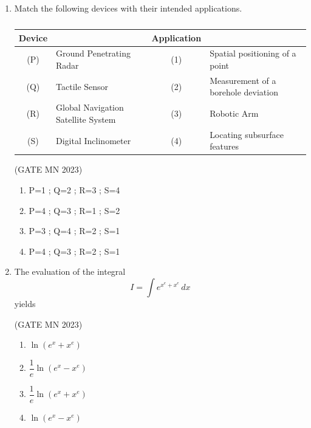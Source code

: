 \documentclass[journal]{IEEEtran}
\begin{document}
\begin{enumerate}
\hfill(GATE MN 2023)
\begin{enumerate}
    \item Shotcrete of thickness 9--12 cm, bolt length of 2.7--2.8 m
    \item Shotcrete of thickness 9--12 cm, bolt length of 3.0--3.2 m
    \item Shotcrete of thickness 5--9 cm, bolt length of 2.7--2.8 m
    \item Shotcrete of thickness 5--9 cm, bolt length of 2.5--2.6 m
\end{enumerate}

 
\item Match the following devices with their intended applications.  
\begin{table}[H]                                   
	\centering\normalsize
\begin{tabular}{|c|l|c|l|}
\hline
\textbf{Device} & & \textbf{Application} & \\
\hline
(P) & Ground Penetrating Radar & (1) & Spatial positioning of a point \\\hline
(Q) & Tactile Sensor           & (2) & Measurement of a borehole deviation \\\hline
(R) & Global Navigation Satellite System & (3) & Robotic Arm \\\hline
(S) & Digital Inclinometer     & (4) & Locating subsurface features \\
\hline
\end{tabular}
\caption{}                    
\label{tab:Q38}                  
\end{table}

\hfill(GATE MN 2023)
\begin{multicols}{2}
\begin{enumerate}[label=(\Alph*)]
    \item P=1 ; Q=2 ; R=3 ; S=4
    \item P=4 ; Q=3 ; R=1 ; S=2
    \item P=3 ; Q=4 ; R=2 ; S=1
    \item P=4 ; Q=3 ; R=2 ; S=1
\end{enumerate}
\end{multicols}

\item The evaluation of the integral  
\[
I = \int e^{x^e + x^e} \, dx
\]  
yields  


\hfill(GATE MN 2023)
\begin{multicols}{2}
\begin{enumerate}[label=(\Alph*)]
    \item $\ln(e^x + x^e)$
    \item $\dfrac{1}{e}\ln(e^x - x^e)$
    \item $\dfrac{1}{e}\ln(e^x + x^e)$
    \item $\ln(e^x - x^e)$
\end{enumerate}
\end{multicols}


\end{enumerate}
\end{document}
